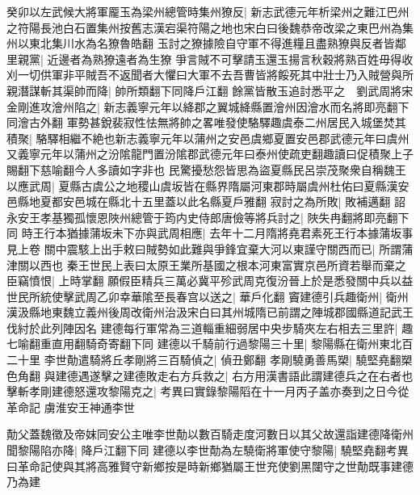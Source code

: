 癸卯以左武候大將軍龎玉為梁州總管時集州獠反|{
	新志武德元年析梁州之難江巴州之符陽長池白石置集州按舊志漢宕渠符陽之地也宋白曰後魏恭帝改梁之東巴州為集州以東北集川水為名獠魯皓翻}
玉討之獠據險自守軍不得進糧且盡熟獠與反者皆鄰里親黨|{
	近邊者為熟獠遠者為生獠}
爭言賊不可擊請玉還玉揚言秋穀將熟百姓毋得收刈一切供軍非平賊吾不返聞者大懼曰大軍不去吾曹皆將餒死其中壯士乃入賊營與所親潛謀斬其渠帥而降|{
	帥所類翻下同降戶江翻}
餘黨皆散玉追討悉平之　劉武周將宋金剛進攻澮州陷之|{
	新志義寧元年以絳郡之翼城絳縣置澮州因澮水而名將即亮翻下同澮古外翻}
軍勢甚銳裴寂性怯無將帥之畧唯發使駱驛趣虞泰二州居民入城堡焚其積聚|{
	駱驛相繼不絶也新志義寧元年以蒲州之安邑虞鄉夏置安邑郡武德元年曰虞州又義寧元年以蒲州之汾隂龍門置汾隂郡武德元年曰泰州使疏吏翻趣讀曰促積聚上子賜翻下慈喻翻今人多讀如字非也}
民驚擾愁怨皆思為盜夏縣民呂崇茂聚衆自稱魏王以應武周|{
	夏縣古虞公之地稷山虞坂皆在縣界隋屬河東郡時屬虞州杜佑曰夏縣漢安邑縣地夏都安邑城在縣北十五里蓋以此名縣夏戶雅翻}
寂討之為所敗|{
	敗補邁翻}
詔永安王孝基獨孤懷恩陜州總管于筠内史侍郎唐儉等將兵討之|{
	陜失冉翻將即亮翻下同}
時王行本猶據蒲坂未下亦與武周相應|{
	去年十二月隋將堯君素死王行本據蒲坂事見上卷}
關中震駭上出手敕曰賊勢如此難與爭鋒宜棄大河以東謹守關西而已|{
	所謂蒲津關以西也}
秦王世民上表曰太原王業所基國之根本河東富實京邑所資若舉而棄之臣竊憤恨|{
	上時掌翻}
願假臣精兵三萬必冀平殄武周克復汾晉上於是悉發關中兵以益世民所統使擊武周乙卯幸華隂至長春宫以送之|{
	華戶化翻}
竇建德引兵趣衛州|{
	衛州漢汲縣地東魏立義州後周改衛州治汲宋白曰其州城隋已前謂之陣城郡國縣道記武王伐紂於此列陣因名}
建德每行軍常為三道輜重細弱居中央步騎夾左右相去三里許|{
	趣七喻翻重直用翻騎奇寄翻下同}
建德以千騎前行過黎陽三十里|{
	黎陽縣在衛州東北百二十里}
李世勣遣騎將丘孝剛將三百騎偵之|{
	偵丑鄭翻}
孝剛驍勇善馬槊|{
	驍堅堯翻槊色角翻}
與建德遇遂擊之建德敗走右方兵救之|{
	右方用漢書語此謂建德兵之在右者也}
擊斬孝剛建德怒還攻黎陽克之|{
	考異曰實錄黎陽䧟在十一月丙子盖亦奏到之日今從革命記}
虜淮安王神通李世

勣父蓋魏徵及帝妺同安公主唯李世勣以數百騎走度河數日以其父故還詣建德降衛州聞黎陽陷亦降|{
	降戶江翻下同}
建德以李世勣為左驍衛將軍使守黎陽|{
	驍堅堯翻考異曰革命記使與其將高雅賢守新鄉按是時新鄉猶屬王世充使劉黑闥守之世勣既事建德乃為建}


